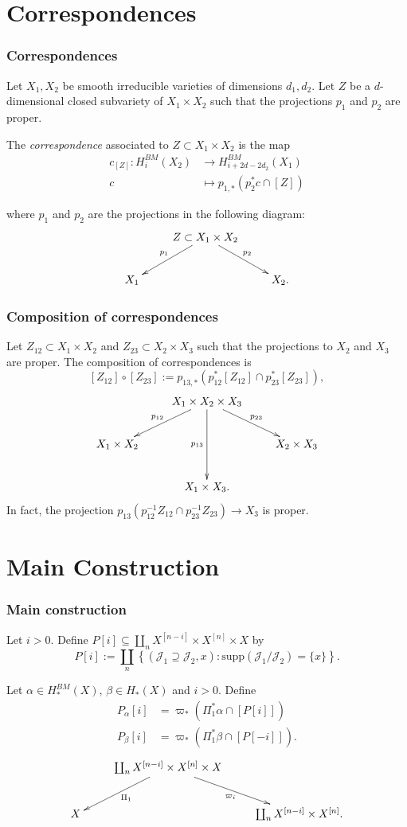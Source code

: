 \documentclass{beamer}
\begin{document}
\section{Correspondences}

\begin{frame}%
\frametitle{Correspondences}
Let $X_1,X_2$ be smooth irreducible varieties
of dimensions $d_1,d_2$.
Let $Z$ be a $d$-dimensional 
closed subvariety of $X_1\times X_2$ 
such that the projections $p_1$ and $p_2$
are proper.

\medskip\noindent
The {\it correspondence} associated to $Z \subset X_1\times X_2$
is the map
\begin{align*}
c_{[Z]}:H_i^{BM}(X_2)&\longrightarrow H_{i+2d-2d_2}^{BM}(X_1)\\
c&\longmapsto p_{1,*}(p_2^*c\cap [Z])
\end{align*}

\noindent
where $p_1$ and $p_2$ are the projections in the following diagram:
$$
\xymatrix{
&Z\ar[ld]_{p_1}\ar[rd]^{p_2} \subset X_1\times X_2\\
X_1&&X_2.
}
$$
\end{frame}

\begin{frame}%
\frametitle{Composition of correspondences}
Let $Z_{12} \subset X_1 \times X_2$ and $Z_{23} \subset X_2 \times X_3$
such that the projections to $X_2$ and $X_3$ are proper.
The composition of correspondences is
$$
[Z_{12}]\circ[Z_{23}]:=p_{13,*}(p_{12}^* [Z_{12}]\cap p_{23}^* [Z_{23}]),
$$
$$
\xymatrix{
&  X_1 \times X_2 \times X_3\ar[dl]_{p_{12}}\ar[dr]^{p_{23}}\ar[dd]_{p_{13}}\\
 X_1\times X_2& & X_2\times X_3\\
& X_1\times X_3.
}
$$
In fact,
the projection $p_{13}(p_{12}^{-1}Z_{12} \cap p_{23}^{-1} Z_{23})\to X_3$ 
is proper.
\end{frame}


\section{Main Construction}

\begin{frame}%
\frametitle{Main construction}
Let $i>0$. Define $P[i] \subseteq
\coprod_nX^{[n-i]}\times X^{[n]}\times X$
by
$$
P[i]:=\coprod_n 
\left\{(\mathcal{J}_1\supseteq\mathcal{J}_2,x):
\text{supp}(\mathcal{J}_1/\mathcal{J}_2)=\{x\}\right\}.
$$

\pause
Let
$\alpha \in H_*^{BM}(X)$, $\beta \in H_*(X)$
and $i>0$. Define
\begin{align*}
P_\alpha[i]&=\varpi_*(\Pi_1^*\alpha \cap [P[i]])\\
P_\beta[i]&=\varpi_*(\Pi_1^*\beta \cap [P[-i]]).
\end{align*}
$$
\xymatrix{
&  \coprod_n X^{[n-i]}\times X^{[n]}\times X
\ar[dl]^{\Pi_1}\ar[dr]_{\varpi_i}\\
X&&\coprod_n X^{[n-i]}\times X^{[n]}.
}
$$
\end{frame}
\end{document}

